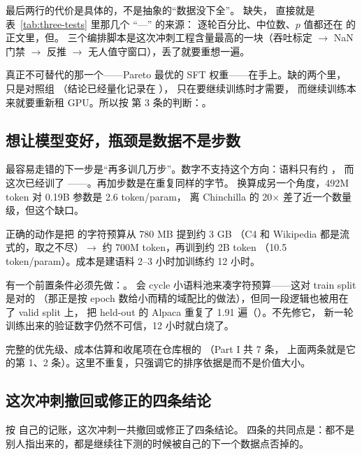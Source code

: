 最后两行的代价是具体的，不是抽象的“数据没下全”。 缺失，
直接就是  表~\ref{tab:three-tests} 里那几个 “---” 的来源：
逐轮百分比、中位数、$p$ 值都还在  的正文里，但。
三个编排脚本是这次冲刺工程含量最高的一块（吞吐标定 $\to$ NaN 门禁 $\to$ 反推 
$\to$ 无人值守窗口），丢了就要重想一遍。

真正不可替代的那一个——Pareto 最优的 SFT 权重——在手上。缺的两个里， 只是对照组
（结论已经量化记录在 ）， 只在要继续训练时才需要，
而继续训练本来就要重新租 GPU。所以按  第 3 条的判断：。

\subsection*{想让模型变好，瓶颈是数据不是步数}

最容易走错的下一步是“再多训几万步”。数字不支持这个方向：语料只有约 ，
而这次已经训了 ——。再加步数是在重复同样的字节。
换算成另一个角度，492M token 对 0.19B 参数是 2.6 token/param，
离 Chinchilla 的 20$\times$ 差了近一个数量级，但这个缺口。

正确的动作是把  的字符预算从 780 MB 提到约 3 GB
（C4 和 Wikipedia 都是流式的，取之不尽）$\to$ 约 700M token，再训到约 2B token
（10.5 token/param）。成本是建语料 2--3 小时加训练约 12 小时。

有一个前置条件必须先做：。
 会 cycle 小语料池来凑字符预算——这对 train split 是对的
（那正是按 epoch 数给小而精的域配比的做法），但同一段逻辑也被用在了 valid split 上，
把 held-out 的 Alpaca 重复了 1.91 遍（）。不先修它，
新一轮训练出来的验证数字仍然不可信，12 小时就白烧了。

完整的优先级、成本估算和收尾项在仓库根的 （Part I 共 7 条，
上面两条就是它的第 1、2 条）。这里不重复，只强调它的排序依据是而不是价值大小。

\subsection*{这次冲刺撤回或修正的四条结论}

按  自己的记账，这次冲刺一共撤回或修正了四条结论。
四条的共同点是：都不是别人指出来的，都是继续往下测的时候被自己的下一个数据点否掉的。

